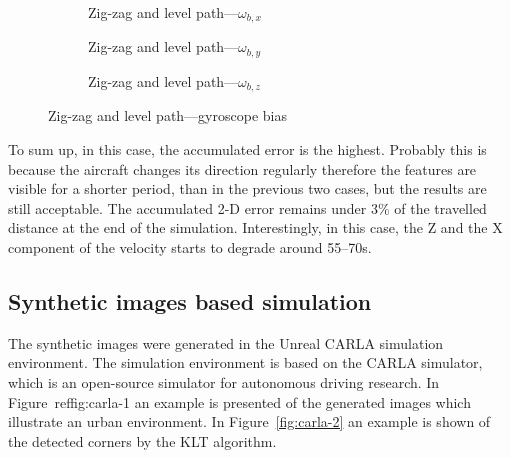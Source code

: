 \begin{figure}[H]
    \centering
    \begin{subfigure}{0.3\textwidth}
        
        \caption{Zig-zag and level path---$\omega_{b,x}$}
    \end{subfigure}
    \hfill
    \begin{subfigure}{0.3\textwidth}
        
        \caption{Zig-zag and level path---$\omega_{b,y}$}
    \end{subfigure}
    \hfill
    \begin{subfigure}{0.3\textwidth}
        
        \caption{Zig-zag and level path---$\omega_{b,z}$}
    \end{subfigure}
    \caption{Zig-zag and level path---gyroscope bias}\label{fig:zig-zag-level-gbias}
\end{figure}

To sum up, in this case, the accumulated error is the highest. Probably this is because the aircraft changes its direction regularly therefore the features are visible for a shorter period, than in the previous two cases, but the results are still acceptable. The accumulated 2-D error remains under 3\% of the travelled distance at the end of the simulation. Interestingly, in this case, the Z and the X component of the velocity starts to degrade around 55--70\si{\second}.

\subsection{Synthetic images based simulation}

The synthetic images were generated in the Unreal CARLA simulation environment. The simulation environment is based on the CARLA simulator, which is an open-source simulator for autonomous driving research. In Figure~ref{fig:carla-1} an example is presented of the generated images which illustrate an urban environment. In Figure~\ref{fig:carla-2} an example is shown of the detected corners by the KLT algorithm.

